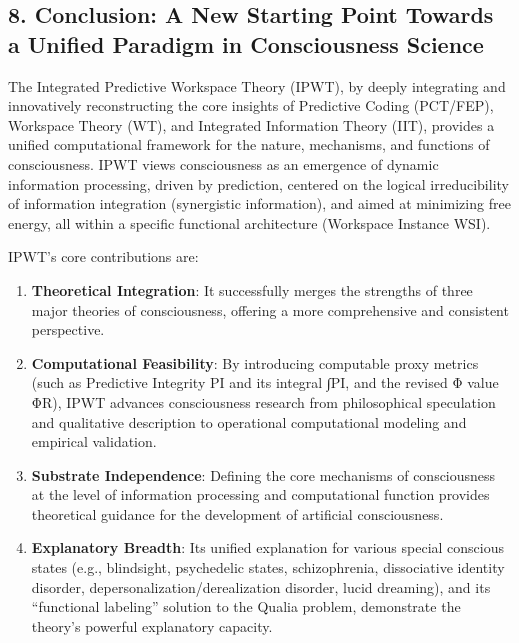 \documentclass[
  a4paper]{article}
\providecommand{\tightlist}{%
  \setlength{\itemsep}{0pt}\setlength{\parskip}{0pt}}
\begin{document}
\subsection{8. Conclusion: A New Starting Point Towards a Unified
Paradigm in Consciousness
Science}\label{conclusion-a-new-starting-point-towards-a-unified-paradigm-in-consciousness-science}

The Integrated Predictive Workspace Theory (IPWT), by deeply integrating
and innovatively reconstructing the core insights of Predictive Coding
(PCT/FEP), Workspace Theory (WT), and Integrated Information Theory
(IIT), provides a unified computational framework for the nature,
mechanisms, and functions of consciousness. IPWT views consciousness as
an emergence of dynamic information processing, driven by prediction,
centered on the logical irreducibility of information integration
(synergistic information), and aimed at minimizing free energy, all
within a specific functional architecture (Workspace Instance WSI).

IPWT's core contributions are:

\begin{enumerate}
\def\labelenumi{\arabic{enumi}.}
\tightlist
\item
  \textbf{Theoretical Integration}: It successfully merges the strengths
  of three major theories of consciousness, offering a more
  comprehensive and consistent perspective.
\item
  \textbf{Computational Feasibility}: By introducing computable proxy
  metrics (such as Predictive Integrity PI and its integral ∫PI, and the
  revised Φ value ΦR), IPWT advances consciousness research from
  philosophical speculation and qualitative description to operational
  computational modeling and empirical validation.
\item
  \textbf{Substrate Independence}: Defining the core mechanisms of
  consciousness at the level of information processing and computational
  function provides theoretical guidance for the development of
  artificial consciousness.
\item
  \textbf{Explanatory Breadth}: Its unified explanation for various
  special conscious states (e.g., blindsight, psychedelic states,
  schizophrenia, dissociative identity disorder,
  depersonalization/derealization disorder, lucid dreaming), and its
  ``functional labeling'' solution to the Qualia problem, demonstrate
  the theory's powerful explanatory capacity.
\end{enumerate}
\end{document}
